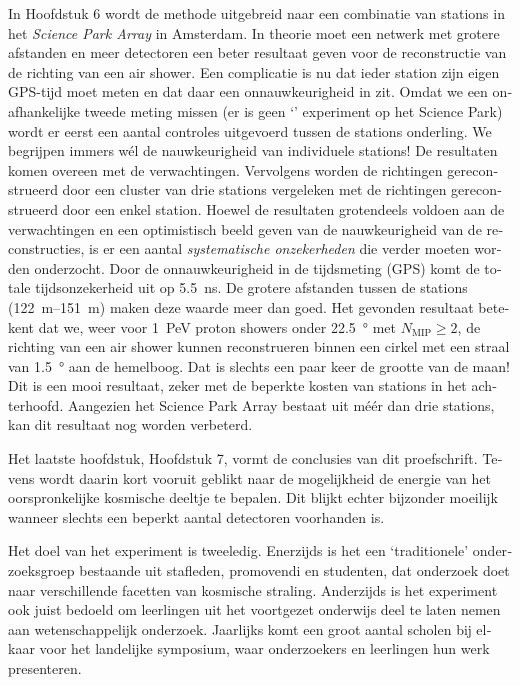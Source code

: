 \begin{otherlanguage}{dutch}
In Hoofdstuk 6 wordt de methode uitgebreid naar een combinatie van
stations in het \emph{Science Park Array} in Amsterdam.  In theorie moet
een netwerk met grotere afstanden en meer detectoren een beter resultaat
geven voor de reconstructie van de richting van een air shower.  Een
complicatie is nu dat ieder station zijn eigen GPS-tijd moet meten en dat
daar een onnauwkeurigheid in zit.  Omdat we een onafhankelijke tweede
meting missen (er is geen `\kascade' experiment op het Science Park) wordt
er eerst een aantal controles uitgevoerd tussen de stations onderling.  We
begrijpen immers wél de nauwkeurigheid van individuele stations!  De
resultaten komen overeen met de verwachtingen.  Vervolgens worden de
richtingen gereconstrueerd door een cluster van drie stations vergeleken
met de richtingen gereconstrueerd door een enkel station.  Hoewel de
resultaten grotendeels voldoen aan de verwachtingen en een optimistisch
beeld geven van de nauwkeurigheid van de reconstructies, is er een aantal
\emph{systematische onzekerheden} die verder moeten worden onderzocht.
Door de onnauwkeurigheid in de tijdsmeting (GPS) komt de totale
tijdsonzekerheid uit op \SI{5.5}{\nano\second}.  De grotere afstanden
tussen de stations (\SIrange[range-phrase={ tot }]{122}{151}{\meter})
maken deze waarde meer dan goed.  Het gevonden resultaat betekent dat we,
weer voor \SI{1}{\peta\electronvolt} proton showers onder
\SI{22.5}{\degree} met $N_\mathrm{MIP} \geq 2$, de richting van een air
shower kunnen reconstrueren binnen een cirkel met een straal van
\SI{1.5}{\degree} aan de hemelboog.  Dat is slechts een paar keer de
grootte van de maan!  Dit is een mooi resultaat, zeker met de beperkte
kosten van \hisparc stations in het achterhoofd.  Aangezien het Science
Park Array bestaat uit méér dan drie stations, kan dit resultaat nog
worden verbeterd.

Het laatste hoofdstuk, Hoofdstuk 7, vormt de conclusies van dit
proefschrift.  Tevens wordt daarin kort vooruit geblikt naar de
mogelijkheid de energie van het oorspronkelijke kosmische deeltje te
bepalen.  Dit blijkt echter bijzonder moeilijk wanneer slechts een beperkt
aantal detectoren voorhanden is.

Het doel van het \hisparc experiment is tweeledig.  Enerzijds is het een
`traditionele' onderzoeksgroep bestaande uit stafleden, promovendi en
studenten, dat onderzoek doet naar verschillende facetten van kosmische
straling.  Anderzijds is het experiment ook juist bedoeld om leerlingen
uit het voortgezet onderwijs deel te laten nemen aan wetenschappelijk
onderzoek.  Jaarlijks komt een groot aantal scholen bij elkaar voor het
landelijke \hisparc symposium, waar onderzoekers en leerlingen hun werk
presenteren.

\end{otherlanguage}
